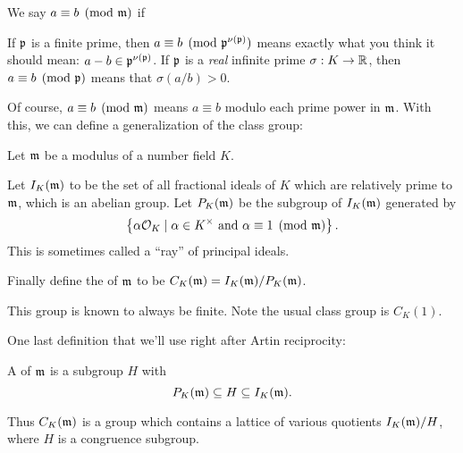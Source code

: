 We say $a \equiv b \pmod{\mathfrak m}$ if
\begin{itemize}
	\ii If $\mathfrak p$ is a finite prime, then $a \equiv b \pmod{\mathfrak p^{\nu(\mathfrak p)}}$
	means exactly what you think it should mean:
	$a-b \in \mathfrak p^{\nu(\mathfrak p)}$.
	\ii If $\mathfrak p$ is a \emph{real} infinite prime $\sigma : K \to \mathbb R$, then
	$a \equiv b \pmod{\mathfrak p}$ means that $\sigma(a/b) > 0$.
\end{itemize}
Of course, $a \equiv b \pmod{\mathfrak m}$ means $a \equiv b$
modulo each prime power in $\mathfrak m$.
With this, we can define a generalization of the class group:
\begin{definition}
	Let $\mathfrak m$ be a modulus of a number field $K$.
	\begin{itemize}
		\ii Let $I_K(\mathfrak m)$ to be the set of all fractional ideals of $K$
		which are relatively prime to $\mathfrak m$, which is an abelian group.
		\ii Let $P_K(\mathfrak m)$ be the subgroup of $I_K(\mathfrak m)$ generated by
		\[
			\left\{
				\alpha \mathcal O_K
				\mid 
				\alpha \in K^\times \text{ and }
				\alpha \equiv 1 \pmod{\mathfrak m}
			\right\}.
		\]
		This is sometimes called a ``ray'' of principal ideals.
	\end{itemize}
	Finally define the  of $\mathfrak m$
	to be $C_K(\mathfrak m) = I_K(\mathfrak m) / P_K(\mathfrak m)$.
\end{definition}
This group is known to always be finite.
Note the usual class group is $C_K(1)$.

One last definition that we'll use right after Artin reciprocity:
\begin{definition}
	A  of $\mathfrak m$ is a subgroup $H$ with
	\[ P_K(\mathfrak m) \subseteq H \subseteq I_K(\mathfrak m). \]
\end{definition}
Thus $C_K(\mathfrak m)$ is a group which contains a lattice of various
quotients $I_K(\mathfrak m) / H$, where $H$ is a congruence subgroup.

